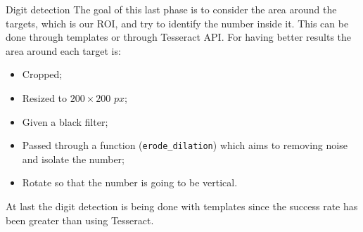 \begin{frame}[fragile]{Digit detection}
The goal of this last phase is to consider the area around the targets, which is our ROI, and try to identify the number inside it. \newline
This can be done through templates or through Tesseract API. 
For having better results the area around each target is:
\begin{itemize}
	\item Cropped;
	\item Resized to $200\times 200$ $px$;
	\item Given a black filter;
	\item Passed through a function (\texttt{erode_dilation}) which aims to removing noise and isolate the number;
	\item Rotate so that the number is going to be vertical.
\end{itemize}
At last the digit detection is being done with templates since the success rate has been greater than using Tesseract. 
\end{frame}

%

